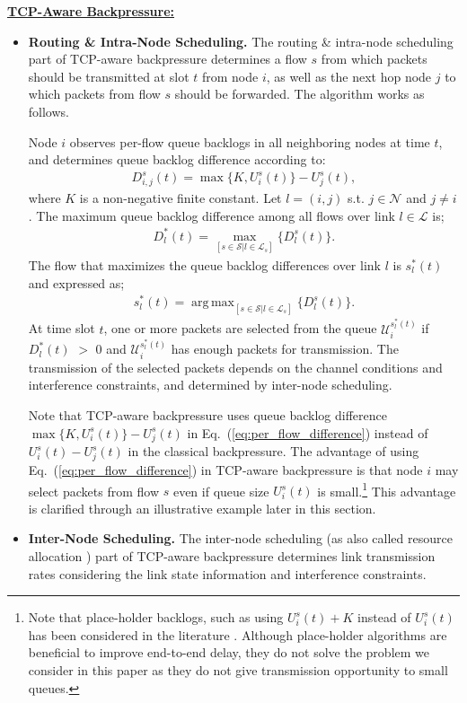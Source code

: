 \documentclass[conference]{IEEEtran}
\newcommand{\Sset}{\mathcal{S}}
\newcommand{\Nset}{\mathcal{N}}
\newcommand{\Lset}{\mathcal{L}}
\newcommand{\Uset}{\mathcal{U}}
\DeclareMathOperator*{\argmax}{arg\,max}
\begin{document}
\textbf{\underline{TCP-Aware Backpressure:}}
\begin{itemize}
\item \textbf{Routing \& Intra-Node Scheduling.} The routing \& intra-node scheduling part of TCP-aware backpressure determines a flow $s$ from which packets should be transmitted at slot $t$ from node $i$, as well as the next hop node $j$ to which packets from flow $s$ should be forwarded. The algorithm works as follows.

  Node $i$ observes per-flow queue backlogs in all neighboring nodes at time $t$, and determines queue backlog difference according to:
  \begin{align} \label{eq:per_flow_difference}
  D_{i,j}^{s}(t) = \max\{K,U_{i}^{s}(t)\} - U_{j}^{s}(t),
  \end{align} where $K$ is a non-negative finite constant. Let $l = (i,j)$ s.t. $j \in \Nset$ and $j \neq i$. The maximum queue backlog difference among all flows over link $l \in \Lset$ is;
  \begin{align} \label{eq:per_link_difference}
  D_{l}^{*}(t) = \max_{[s \in \Sset | l \in \Lset_{s}]} \{ D_{l}^{s}(t) \}.
  \end{align}
  The flow that maximizes the queue backlog differences over link $l$ is $s_{l}^{*}(t)$ and expressed as;
  \begin{align} \label{eq:selected_flow}
  s_{l}^{*}(t) = \argmax_{[s \in \Sset | l \in \Lset_{s}]} \{ D_{l}^{s}(t) \}.
  \end{align}
  At time slot $t$, one or more packets are selected from the queue $\Uset_{i}^{s_{l}^{*}(t)}$ if $D_{l}^{*}(t)$ $>$ $0$ and $\Uset_{i}^{s_{l}^{*}(t)}$ has enough packets for transmission. The transmission of the selected packets depends on the channel conditions and interference constraints, and determined by inter-node scheduling.

  Note that TCP-aware backpressure uses queue backlog difference $\max\{K,U_{i}^{s}(t)\} - U_{j}^{s}(t)$ in Eq.~(\ref{eq:per_flow_difference}) instead of $U_{i}^{s}(t) - U_{j}^{s}(t)$ in the classical backpressure. The advantage of using Eq.~(\ref{eq:per_flow_difference}) in TCP-aware backpressure is that node $i$ may select packets from flow $s$ even if queue size $U_{i}^{s}(t)$ is small.\footnote{\scriptsize Note that place-holder backlogs, such as using $U_{i}^{s}(t)+K$ instead of $U_{i}^{s}(t)$ has been considered in the literature \cite{neely_book}. Although place-holder algorithms are beneficial to improve end-to-end delay, they do not solve the problem we consider in this paper as they do not give transmission opportunity to small queues.} This advantage is clarified through an illustrative example later in this section.
\item \textbf{Inter-Node Scheduling.} The inter-node scheduling (as also called resource allocation \cite{neely_mod}) part of TCP-aware backpressure determines link transmission rates considering the link state information and interference constraints.


\end{itemize}
\end{document}
